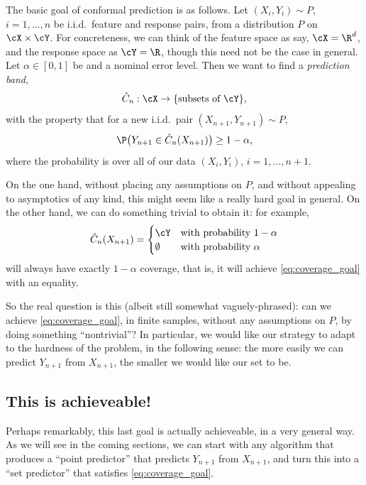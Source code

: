 \documentclass{article}
\begin{document}
The basic goal of conformal prediction is as follows. Let $(X_i,Y_i) \sim P$,
$i=1,\dots,n$ be i.i.d.\ feature and response pairs, from a distribution 
$P$ on $\cX \times \cY$. For concreteness, we can think of the feature space as
say, $\cX = \R^d$, and the response space as $\cY = \R$, though this need not be 
the case in general. Let $\alpha \in [0,1]$ be and a nominal error level. Then
we want to find a \emph{prediction band}, 
\[
\hC_n : \cX \to \{ \text{subsets of $\cY$} \},
\]
with the property that for a new i.i.d.\ pair $(X_{n+1},Y_{n+1}) \sim P$,
\begin{equation}
\label{eq:coverage_goal}
\P\big( Y_{n+1} \in \hC_n(X_{n+1}) \big) \geq 1-\alpha,
\end{equation}
where the probability is over all of our data $(X_i,Y_i)$, $i=1,\dots,n+1$. 

On the one hand, without placing any assumptions on $P$, and without appealing
to asymptotics of any kind, this might seem like a really hard goal in
general. On the other hand, we can do something trivial to obtain it: for example,   
\[
\hC_n(X_{n+1}) = 
\begin{cases}
\cY & \text{with probability $1-\alpha$} \\
\emptyset & \text{with probability $\alpha$}
\end{cases}
\]
will always have exactly $1-\alpha$ coverage, that is, it will achieve
\eqref{eq:coverage_goal} with an equality.   

So the real question is this (albeit still somewhat vaguely-phrased): can we
achieve \eqref{eq:coverage_goal}, in finite samples, without any assumptions on
$P$, by doing something ``nontrivial''? In particular, we would like our
strategy to adapt to the hardness of the problem, in the following sense: the
more easily we can predict $Y_{n+1}$ from $X_{n+1}$, the smaller we would like
our set  to be. 

\subsection{This is achieveable!}
\label{sec:no_features}

Perhaps remarkably, this last goal is actually achieveable, in a very general
way. As we will see in the coming sections, we can start with any algorithm that
produces a ``point predictor''  that predicts $Y_{n+1}$ from
$X_{n+1}$, and turn this into a ``set predictor''  that satisfies
\eqref{eq:coverage_goal}. 
\end{document}
